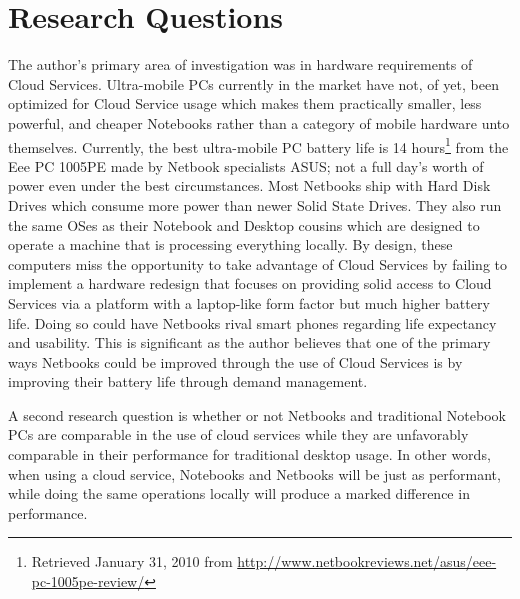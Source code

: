 \section{Research Questions}

The author's primary area of investigation was in hardware requirements of Cloud
Services.  Ultra-mobile PCs currently in the market have not, of yet, been
optimized for Cloud Service usage which makes them practically smaller, less
powerful, and cheaper Notebooks rather than a category of mobile hardware unto
themselves.  Currently, the best ultra-mobile PC battery life is 14
hours\footnote{Retrieved January 31, 2010 from
  \url{http://www.netbookreviews.net/asus/eee-pc-1005pe-review/}} from the Eee
PC 1005PE made by Netbook specialists ASUS; not a full day's worth of power even
under the best circumstances.  Most Netbooks ship with Hard Disk Drives which
consume more power than newer Solid State Drives.  They also run the same OSes
as their Notebook and Desktop cousins which are designed to operate a machine
that is processing everything locally.  By design, these computers miss the
opportunity to take advantage of Cloud Services by failing to implement a
hardware redesign that focuses on providing solid access to Cloud Services via
a platform with a laptop-like form factor but much higher battery life.  Doing
so could have Netbooks rival smart phones regarding life expectancy and
usability.  This is significant as the author believes that one of the primary
ways Netbooks could be improved through the use of Cloud Services is by
improving their battery life through demand management.


A second research question is whether or not Netbooks and traditional Notebook
PCs are comparable in the use of cloud services while they are unfavorably
comparable in their performance for traditional desktop usage.  In other words,
when using a cloud service, Notebooks and Netbooks will be just as performant,
while doing the same operations locally will produce a marked difference in
performance.
